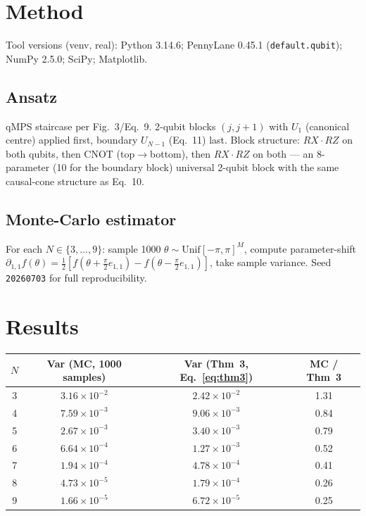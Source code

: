 \documentclass[11pt]{article}
\begin{document}
\section{Method}
Tool versions (venv, real): Python 3.14.6; PennyLane 0.45.1 (\texttt{default.qubit}); NumPy 2.5.0; SciPy; Matplotlib.

\subsection{Ansatz}
qMPS staircase per Fig.~3/Eq.~9. 2-qubit blocks $(j,j{+}1)$ with $U_1$ (canonical centre) applied first, boundary $U_{N-1}$ (Eq.~11) last. Block structure: $RX{\cdot}RZ$ on both qubits, then CNOT (top$\to$bottom), then $RX{\cdot}RZ$ on both --- an 8-parameter (10 for the boundary block) universal 2-qubit block with the same causal-cone structure as Eq.~10.

\subsection{Monte-Carlo estimator}
For each $N \in \{3,\dots,9\}$: sample 1000 $\theta \sim \mathrm{Unif}[-\pi,\pi]^M$, compute parameter-shift $\partial_{1,1}f(\theta)=\tfrac{1}{2}[f(\theta+\tfrac{\pi}{2}e_{1,1}) - f(\theta-\tfrac{\pi}{2}e_{1,1})]$, take sample variance. Seed \texttt{20260703} for full reproducibility.

\section{Results}
\begin{center}
\begin{tabular}{cccc}
\toprule
$N$ & Var (MC, 1000 samples) & Var (Thm~3, Eq.~\ref{eq:thm3}) & MC / Thm~3 \\
\midrule
3 & $3.16\times10^{-2}$ & $2.42\times10^{-2}$ & 1.31 \\
4 & $7.59\times10^{-3}$ & $9.06\times10^{-3}$ & 0.84 \\
5 & $2.67\times10^{-3}$ & $3.40\times10^{-3}$ & 0.79 \\
6 & $6.64\times10^{-4}$ & $1.27\times10^{-3}$ & 0.52 \\
7 & $1.94\times10^{-4}$ & $4.78\times10^{-4}$ & 0.41 \\
8 & $4.73\times10^{-5}$ & $1.79\times10^{-4}$ & 0.26 \\
9 & $1.66\times10^{-5}$ & $6.72\times10^{-5}$ & 0.25 \\
\bottomrule
\end{tabular}
\end{center}
\end{document}
